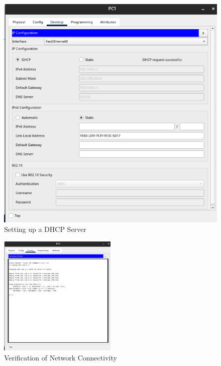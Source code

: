 \documentclass[a4paper,12pt]{article}
\begin{document}
\begin{itemize}
\begin{figure}[!ht]
\begin{minipage}{0.45\textwidth}
                  \includegraphics[width=\textwidth]{img/dhcp.png}
                  \caption{Setting up a DHCP Server}
                  \label{fig:dhcp_server}
              \end{minipage}
          \end{figure}

		  \begin{figure}[!ht]
              \centering
              \includegraphics[width=0.5\textwidth]{img/connectivity.png}
              \caption{Verification of Network Connectivity}
              \label{fig:network_connectivity}
          \end{figure}

\end{itemize}
\end{document}
